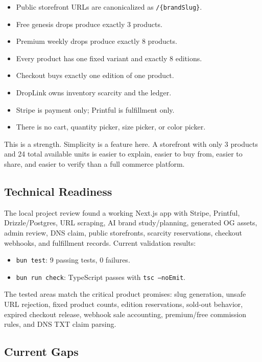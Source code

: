\documentclass[11pt]{article}
\begin{document}
\begin{itemize}
  \item Public storefront URLs are canonicalized as \texttt{/\{brandSlug\}}.
  \item Free genesis drops produce exactly 3 products.
  \item Premium weekly drops produce exactly 8 products.
  \item Every product has one fixed variant and exactly 8 editions.
  \item Checkout buys exactly one edition of one product.
  \item DropLink owns inventory scarcity and the ledger.
  \item Stripe is payment only; Printful is fulfillment only.
  \item There is no cart, quantity picker, size picker, or color picker.
\end{itemize}

This is a strength. Simplicity is a feature here. A storefront with only 3 products and 24 total available units is easier to explain, easier to buy from, easier to share, and easier to verify than a full commerce platform.

\subsection{Technical Readiness}

The local project review found a working Next.js app with Stripe, Printful, Drizzle/Postgres, URL scraping, AI brand study/planning, generated OG assets, admin review, DNS claim, public storefronts, scarcity reservations, checkout webhooks, and fulfillment records. Current validation results:

\begin{itemize}
  \item \texttt{bun test}: 9 passing tests, 0 failures.
  \item \texttt{bun run check}: TypeScript passes with \texttt{tsc --noEmit}.
\end{itemize}

The tested areas match the critical product promises: slug generation, unsafe URL rejection, fixed product counts, edition reservations, sold-out behavior, expired checkout release, webhook sale accounting, premium/free commission rules, and DNS TXT claim parsing.

\subsection{Current Gaps}
\end{document}
